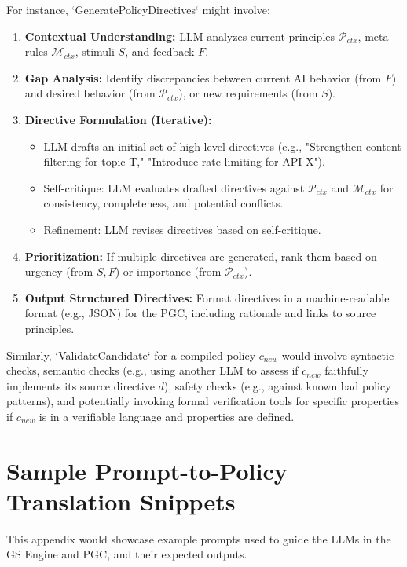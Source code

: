 \documentclass[sigconf,review,screen]{acmart}
\begin{document}
For instance, `GeneratePolicyDirectives` might involve:
\begin{enumerate}
    \item \textbf{Contextual Understanding:} LLM analyzes current principles $\mathcal{P}_{ctx}$, meta-rules $\mathcal{M}_{ctx}$, stimuli $S$, and feedback $F$.
    \item \textbf{Gap Analysis:} Identify discrepancies between current AI behavior (from $F$) and desired behavior (from $\mathcal{P}_{ctx}$), or new requirements (from $S$).
    \item \textbf{Directive Formulation (Iterative):}
        \begin{itemize}
            \item LLM drafts an initial set of high-level directives (e.g., "Strengthen content filtering for topic T," "Introduce rate limiting for API X").
            \item Self-critique: LLM evaluates drafted directives against $\mathcal{P}_{ctx}$ and $\mathcal{M}_{ctx}$ for consistency, completeness, and potential conflicts.
            \item Refinement: LLM revises directives based on self-critique.
        \end{itemize}
    \item \textbf{Prioritization:} If multiple directives are generated, rank them based on urgency (from $S, F$) or importance (from $\mathcal{P}_{ctx}$).
    \item \textbf{Output Structured Directives:} Format directives in a machine-readable format (e.g., JSON) for the PGC, including rationale and links to source principles.
\end{enumerate}
Similarly, `ValidateCandidate` for a compiled policy $c_{new}$ would involve syntactic checks, semantic checks (e.g., using another LLM to assess if $c_{new}$ faithfully implements its source directive $d$), safety checks (e.g., against known bad policy patterns), and potentially invoking formal verification tools for specific properties if $c_{new}$ is in a verifiable language and properties are defined.

\section{Sample Prompt-to-Policy Translation Snippets}
\label{app:prompt_policy_snippets}
This appendix would showcase example prompts used to guide the LLMs in the GS Engine and PGC, and their expected outputs.
\end{document}
